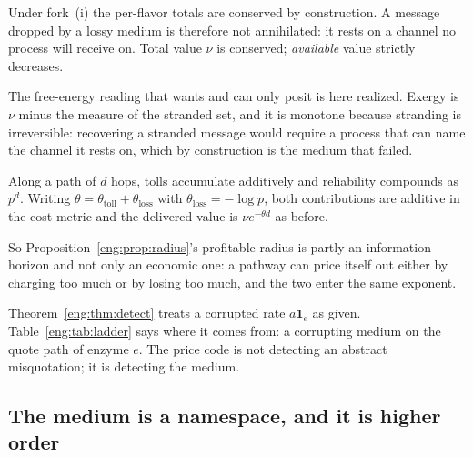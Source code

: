\begin{proposition}
\label{eng:prop:strand}
Under fork~(i) the per-flavor totals are conserved by construction. A
message dropped by a lossy medium is therefore not annihilated: it rests on
a channel no process will receive on. Total value $\nu$ is conserved;
\emph{available} value strictly decreases.
\end{proposition}

\begin{corollary}\label{eng:second-law-with-mechanism}
The free-energy reading that \cite[Rmk.~6.2]{vtok} wants and can only
posit is here realized. Exergy is $\nu$ minus the measure of the stranded
set, and it is monotone because stranding is irreversible: recovering a
stranded message would require a process that can name the channel it rests
on, which by construction is the medium that failed.
\end{corollary}

\begin{proposition}\label{eng:prop:twotheta}
Along a path of $d$ hops, tolls accumulate additively and reliability
compounds as $p^d$. Writing
$\theta = \theta_{\mathrm{toll}} + \theta_{\mathrm{loss}}$ with
$\theta_{\mathrm{loss}} = -\log p$, both contributions are additive in the
cost metric and the delivered value is $\nu e^{-\theta d}$ as before.
\end{proposition}

So Proposition~\ref{eng:prop:radius}'s profitable radius is partly an
information horizon and not only an economic one: a pathway can price
itself out either by charging too much or by losing too much, and the two
enter the same exponent.

\begin{remark}\label{eng:corruption-where-syndrome-comes}
Theorem~\ref{eng:thm:detect} treats a corrupted rate $a\mathbf{1}_e$ as given.
Table~\ref{eng:tab:ladder} says where it comes from: a corrupting medium on the
quote path of enzyme $e$. The price code is not detecting an abstract
misquotation; it is detecting the medium.
\end{remark}

\subsection{The medium is a namespace, and it is higher order}\label{eng:S5.4}

